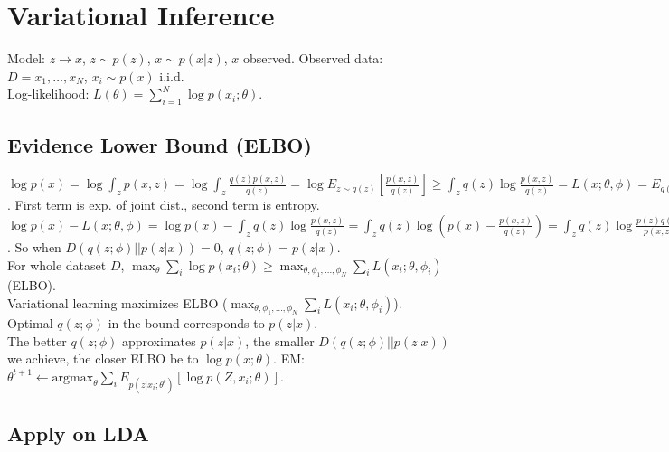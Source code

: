 \section{Variational Inference}

Model: $z \rightarrow x$, $z \sim p(z)$, $x \sim p(x|z)$, $x$ observed.
Observed data: $D = {x_1, \dots, x_N}$, $x_i \sim p(x)$ i.i.d.\\
Log-likelihood: $L(\theta) = \sum_{i=1}^N \log p(x_i; \theta)$.

\subsection*{Evidence Lower Bound (ELBO)}

$\log p(x) = \log \int_z p(x, z) = \log \int_z \frac{q(z)p(x, z)}{q(z)} = \log E_{z \sim q(z)}\left[\frac{p(x, z)}{q(z)}\right] \geq \int_z q(z) \log \frac{p(x, z)}{q(z)} = L(x; \theta, \phi) = E_{q(z)}[\log p(x, z)] + H(q(z))$. First term is exp. of joint dist., second term is entropy.\\
$\log p(x) - L(x; \theta, \phi) = \log p(x) - \int_z q(z) \log \frac{p(x, z)}{q(z)} = \int_z q(z)\log(p(x) - \frac{p(x, z)}{q(z)}) = \int_z q(z) \log \frac{p(z)q(z)}{p(x, z)} = D(q(z)||p(z|x))$. So when $D(q(z; \phi)||p(z | x)) = 0$, $q(z; \phi) = p(z | x)$.\\
For whole dataset $D$, $\max_\theta \sum_i \log p(x_i; \theta) \geq \max_{\theta, \phi_1, \dots, \phi_N} \sum_i L(x_i; \theta, \phi_i)$ (ELBO).\\
Variational learning maximizes ELBO ($\max_{\theta, \phi_1, \dots, \phi_N} \sum_i L(x_i; \theta, \phi_i)$).\\
Optimal $q(z; \phi)$ in the bound corresponds to $p(z|x)$.\\
The better $q(z; \phi)$ approximates $p(z|x)$, the smaller $D(q(z;\phi)||p(z|x))$ we achieve, the closer ELBO be to $\log p(x;\theta)$.
EM: $\theta^{t+1} \leftarrow \text{argmax}_\theta \sum_i E_{p(z|x_i;\theta^t)}[\log p(Z, x_i; \theta)]$.

\subsection*{Apply on LDA}

